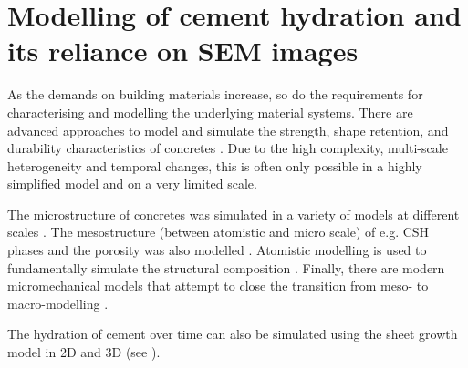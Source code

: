 \FloatBarrier
\section{Modelling of cement hydration and its reliance on \acs*{SEM} images}

As the demands on building materials increase, so do the requirements for characterising and modelling the underlying material systems.
There are advanced approaches to model and simulate the strength, shape retention, and durability characteristics of concretes \cite{bishnoi.2009, kumar.2017, zhou.2019, ouzia.2019, sac-morane.2026}.
Due to the high complexity, multi-scale heterogeneity and temporal changes, this is often only possible in a highly simplified model and on a very limited scale.

The microstructure of concretes was simulated in a variety of models at different scales \cite{bishnoi.2009, kumar.2017, zhou.2019, ouzia.2019}.
The mesostructure (between atomistic and micro scale) of e.g. \ac{CSH} phases and the porosity was also modelled \cite{ioannidou.2016, yu.2016}.
Atomistic modelling is used to fundamentally simulate the structural composition \cite{kumar.2017,mishra.2017,kunhimohamed.2020,casar.2023}.
Finally, there are modern micromechanical models that attempt to close the transition from meso- to macro-modelling \cite{bernard.2003, hlobil.2016, gobel.2018}.

The hydration of cement over time can also be simulated using the sheet growth model in 2D \cite{etzold.2014} and 3D \cite{nguyen-tuan.2019,nguyen-tuan.2023} (see ).

